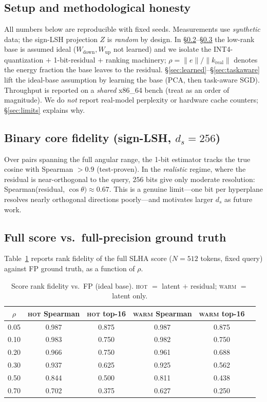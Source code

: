\documentclass[11pt]{article}
\theoremstyle{plain}
\theoremstyle{definition}
\newcommand{\ds}{d_s}
\begin{document}
\subsection{Setup and methodological honesty}
\label{sec:setup}
All numbers below are reproducible with fixed seeds. Measurements use
\emph{synthetic} data; the sign-LSH projection $Z$ is \emph{random} by
design. In \S\ref{sec:bincore}--\S\ref{sec:scorefp} the low-rank base is
assumed ideal ($W_{\text{down}}, W_{\text{up}}$ not learned) and we
isolate the INT4-quantization $+$ 1-bit-residual $+$ ranking machinery;
$\rho = \lVert e\rVert / \lVert k_{\text{real}}\rVert$ denotes the energy
fraction the base leaves to the residual.
\S\ref{sec:learned}--\S\ref{sec:taskaware} lift the ideal-base
assumption by learning the base (PCA, then task-aware SGD).
Throughput is reported on a \emph{shared} x86\_64 bench (treat as an
order of magnitude). We do \emph{not} report real-model perplexity or
hardware cache counters; \S\ref{sec:limits} explains why.

\subsection{Binary core fidelity (sign-LSH, $\ds=256$)}
\label{sec:bincore}
Over pairs spanning the full angular range, the 1-bit estimator tracks
the true cosine with Spearman $> 0.9$ (test-proven). In the
\emph{realistic} regime, where the residual is near-orthogonal to the
query, $256$ bits give only moderate resolution: Spearman(residual,
$\cos\theta) \approx 0.67$. This is a genuine limit---one bit per
hyperplane resolves nearly orthogonal directions poorly---and motivates
larger $\ds$ as future work.

\subsection{Full score vs.\ full-precision ground truth}
\label{sec:scorefp}
Table~\ref{tab:scorefp} reports rank fidelity of the full SLHA score
($N=512$ tokens, fixed query) against FP ground truth, as a function of
$\rho$.

\begin{table}[t]
\centering
\caption{Score rank fidelity vs.\ FP (ideal base). \textsc{hot}
$=$ latent $+$ residual; \textsc{warm} $=$ latent only.}
\label{tab:scorefp}
\small
\begin{tabular}{@{}cccccc@{}}
\toprule
$\rho$ & \textsc{hot} Spearman & \textsc{hot} top-16 & \textsc{warm} Spearman & \textsc{warm} top-16 \\
\midrule
0.05 & 0.987 & 0.875 & 0.987 & 0.875 \\
0.10 & 0.983 & 0.750 & 0.982 & 0.750 \\
0.20 & 0.966 & 0.750 & 0.961 & 0.688 \\
0.30 & 0.937 & 0.625 & 0.925 & 0.562 \\
0.50 & 0.844 & 0.500 & 0.811 & 0.438 \\
0.70 & 0.702 & 0.375 & 0.627 & 0.250 \\
\bottomrule
\end{tabular}
\end{table}
\end{document}
